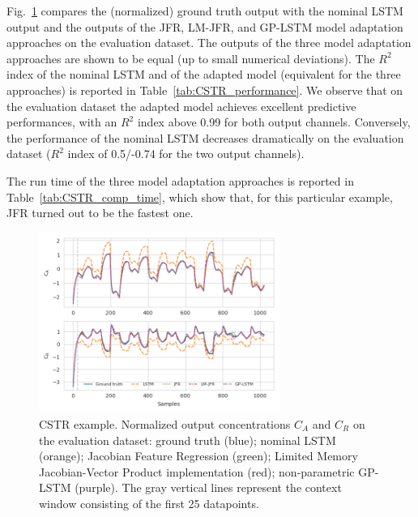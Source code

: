 \documentclass{article}
\begin{document}
 Fig.~\ref{LSTM-compare1} compares the (normalized) ground truth output with the nominal LSTM output and 
 the outputs of the JFR, LM-JFR, and GP-LSTM model adaptation approaches on the evaluation dataset. The 
 outputs of the three model adaptation approaches are shown to be equal (up to small numerical deviations). 
 The $R^2$ index of the nominal LSTM and of the adapted model (equivalent for the three approaches) is reported in Table~\ref{tab:CSTR_performance}. We observe that on the evaluation dataset the adapted model achieves excellent predictive performances, with an $R^2$ index above 0.99 for both output channels. 
 Conversely, the performance of the nominal LSTM decreases dramatically on the evaluation dataset ($R^2$ index of 0.5/-0.74 for the two output channels).
  
 The run time of the three model adaptation approaches is reported in Table~\ref{tab:CSTR_comp_time}, which show that, for this particular example, JFR turned out to be the fastest one.  
 
\begin{figure}[bt]
    \centering
    \includegraphics[width=0.70\textwidth]{figures/CSTR_JFR.png}
    \caption{ CSTR example. Normalized output concentrations $C_A$ and $C_R$ on the evaluation dataset: ground truth (blue); nominal LSTM (orange);   Jacobian Feature Regression (green); Limited Memory Jacobian-Vector Product implementation (red); non-parametric GP-LSTM (purple). The gray vertical lines represent the context window consisting of the first 25 datapoints.} 
    \label{LSTM-compare1}
\end{figure}
\end{document}
